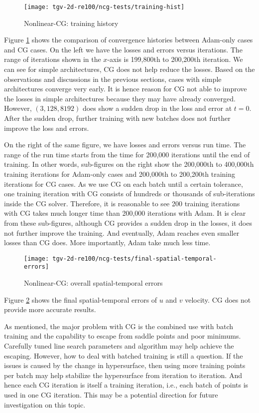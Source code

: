 \begin{figure}[hbt!]
    \centering%
    \texttt{[image: tgv-2d-re100/ncg-tests/training-hist]}%
    \caption[%
        Nonlinear-CG: training history%
    ]{%
        Nonlinear-CG: training history%
    }\label{fig:ncg-tests-train-hist}%
\end{figure}

Figure \ref{fig:ncg-tests-train-hist} shows the comparison of convergence histories between Adam-only cases and CG cases.
On the left we have the losses and errors versus iterations.
The range of iterations shown in the $x$-axis is 199,800th to 200,200th iteration.
We can see for simple architectures, CG does not help reduce the losses.
Based on the observations and discussions in the previous sections, cases with simple architectures converge very early.
It is hence reason for CG not able to improve the losses in simple architectures because they may have already converged.
However, $(3, 128, 8192)$ does show a sudden drop in the loss and error at $t=0$.
After the sudden drop, further training with new batches does not further improve the loss and errors.

On the right of the same figure, we have losses and errors versus run time.
The range of the run time starts from the time for 200,000 iterations until the end of training.
In other words, sub-figures on the right show the 200,000th to 400,000th training iterations for Adam-only cases and 200,000th to 200,200th training iterations for CG cases.
As we use CG on each batch until a certain tolerance, one training iteration with CG consists of hundreds or thousands of sub-iterations inside the CG solver.
Therefore, it is reasonable to see 200 training iterations with CG takes much longer time than 200,000 iterations with Adam.
It is clear from these sub-figures, although CG provides a sudden drop in the losses, it does not further improve the training.
And eventually, Adam reaches even smaller losses than CG does.
More importantly, Adam take much less time.

\begin{figure}[hbt!]
    \centering%
    \texttt{[image: tgv-2d-re100/ncg-tests/final-spatial-temporal-errors]}%
    \caption[%
        Nonlinear-CG: overall spatial-temporal errors%
    ]{%
        Nonlinear-CG: overall spatial-temporal errors%
    }\label{fig:ncg-tests-final-sterrs}%
\end{figure}

Figure \ref{fig:ncg-tests-final-sterrs} shows the final spatial-temporal errors of $u$ and $v$ velocity.
CG does not provide more accurate results.

As mentioned, the major problem with CG is the combined use with batch training and the capability to escape from saddle points and poor minimums.
Carefully tuned line search parameters and algorithm may help achieve the escaping.
However, how to deal with batched training is still a question.
If the issues is caused by the change in hypersurface, then using more training points per batch may help stabilize the hypersurface from iteration to iteration.
And hence each CG iteration is itself a training iteration, i.e., each batch of points is used in one CG iteration.
This may be a potential direction for future investigation on this topic.
